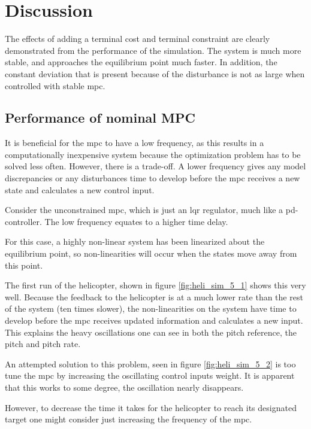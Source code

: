 \chapter{Discussion}\label{ch:discussion}

The effects of adding a terminal cost and terminal constraint are clearly demonstrated from the performance of the simulation. The system is much more stable, and approaches the equilibrium point much faster. In addition, the constant deviation that is present because of the disturbance is not as large when controlled with stable \acrshort{mpc}. 

\section{Performance of nominal MPC}

It is beneficial for the \acrshort{mpc} to have a low frequency, as this results in a computationally inexpensive system because the optimization problem has to be solved less often. However, there is a trade-off. A lower frequency gives any model discrepancies or any disturbances time to develop before the \acrshort{mpc} receives a new state and calculates a new control input. 

Consider the unconstrained \acrshort{mpc}, which is just an \acrshort{lqr} regulator, much like a \acrshort{pd}-controller. The low frequency equates to a higher time delay. 

For this case, a highly non-linear system has been linearized about the equilibrium point, so non-linearities will occur when the states move away from this point. 

The first run of the helicopter, shown in figure \ref{fig:heli_sim_5_1} shows this very well. Because the feedback to the helicopter is at a much lower rate than the rest of the system (ten times slower), the non-linearities on the system have time to develop before the \acrshort{mpc} receives updated information and calculates a new input. This explains the heavy oscillations one can see in both the pitch reference, the pitch and pitch rate. 

An attempted solution to this problem, seen in figure \ref{fig:heli_sim_5_2} is too tune the \acrshort{mpc} by increasing the oscillating control inputs weight. It is apparent that this works to some degree, the oscillation nearly disappears.

However, to decrease the time it takes for the helicopter to reach its designated target one might consider just increasing the frequency of the \acrshort{mpc}. 

